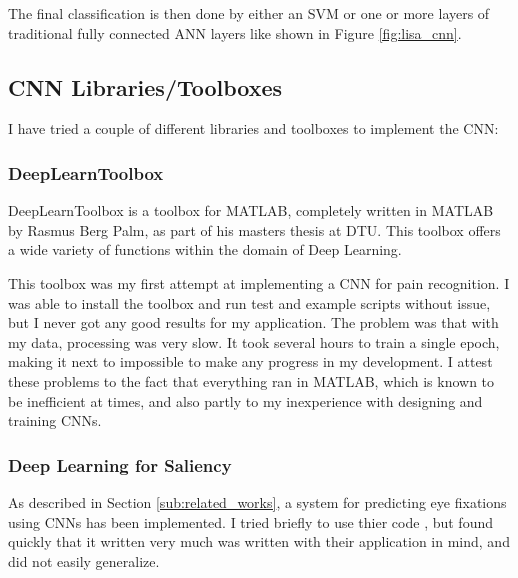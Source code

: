 \documentclass[Main]{subfiles}
\begin{document}
		The final classification is then done by either an SVM or one or more layers of traditional fully connected ANN layers like shown in Figure \ref{fig:lisa_cnn}.


	
	\subsection{CNN Libraries/Toolboxes} %
		\label{sub:cnn_libraries_toolboxes}
		I have tried a couple of different libraries and toolboxes to implement the CNN:
		
		\subsubsection{DeepLearnToolbox} %
			\label{ssub:deeplearntoolbox}
			DeepLearnToolbox \cite{IMM2012-06284} is a toolbox for MATLAB, completely written in MATLAB by Rasmus Berg Palm, as part of his masters thesis at DTU.
			This toolbox offers a wide variety of functions within the domain of Deep Learning.

			This toolbox was my first attempt at implementing a CNN for pain recognition.
			I was able to install the toolbox and run test and example scripts without issue, but I never got any good results for my application.
			The problem was that with my data, processing was very slow.
			It took several hours to train a single epoch, making it next to impossible to make any progress in my development.
			I attest these problems to the fact that everything ran in MATLAB, which is known to be inefficient at times, and also partly to my inexperience with designing and training CNNs.


		\subsubsection{Deep Learning for Saliency} %
			\label{ssub:deep_learning_for_saliency}
			As described in Section \ref{sub:related_works}, a system for predicting eye fixations using CNNs has been implemented.
			I tried briefly to use thier code \cite{Shen2012a}, but found quickly that it written very much was written with their application in mind, and did not easily generalize. 

\end{document}
